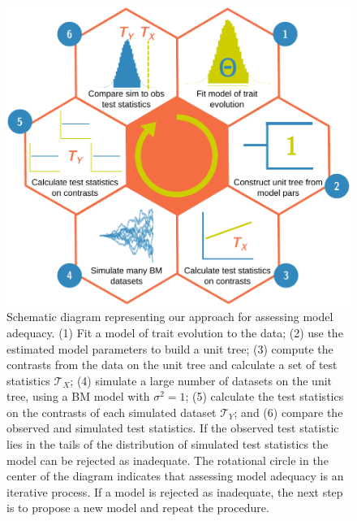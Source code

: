 \documentclass[a4paper,11pt]{article}
\begin{document}
\begin{figure}[p]
  \centering
  \includegraphics[scale=0.85]{figs/flow-diagram}
  \caption{Schematic diagram representing our approach for assessing model adequacy. (1) Fit a model of trait evolution to the data; (2) use the estimated model parameters to build a unit tree; (3) compute the contrasts from the data on the unit tree and calculate a set of test statistics $\mathcal{T}_X$; (4) simulate a large number of datasets on the unit tree, using a BM model with $\sigma^2= 1$; (5) calculate the test statistics on the contrasts of each simulated dataset $\mathcal{T}_Y$; and (6) compare the observed and simulated test statistics. If the observed test statistic lies in the tails of the distribution of simulated test statistics the model can be rejected as inadequate. The rotational circle in the center of the diagram indicates that assessing model adequacy is an iterative process. If a model is rejected as inadequate, the next step is to propose a new model and repeat the procedure.}
  \label{fig:flowchart}
\end{figure}
\end{document}
